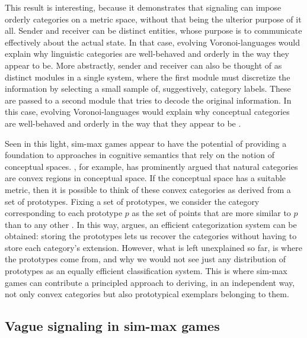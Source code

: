 This result is interesting, because it demonstrates that signaling can
impose orderly categories on a metric space, without that being the
ulterior purpose of it all. Sender and receiver can be distinct
entities, whose purpose is to communicate effectively about the actual
state. In that case, evolving Voronoi-languages would explain why
linguistic categories are well-behaved and orderly in the way they
appear to be. More abstractly, sender and receiver can also be thought
of as distinct modules in a single system, where the first module must
discretize the information by selecting a small sample of,
suggestively, category labels. These are passed to a second module
that tries to decode the original information. In this case, evolving
Voronoi-languages would explain why conceptual categories are
well-behaved and orderly in the way that they appear to be
\citep[e.g.][for more on this latter
interpretation]{OConnor2013:Evolving-Percep}.

Seen in this light, sim-max games appear to have the potential of
providing a foundation to approaches in cognitive semantics that rely
on the notion of conceptual spaces.
\citet[][70--77]{Gardenfors2000:Conceptual-Spac}, for example, has
prominently argued that natural categories are convex regions in
conceptual space. If the conceptual space has a suitable metric, then
it is possible to think of these convex categories as derived from a
set of prototypes. Fixing a set of prototypes, we consider the
category corresponding to each prototype $p$ as the set of points that
are more similar to $p$ than to any other
\citep[e.g.][]{OkabeBoots2000:Spatial-Tessell}. In this way,
\citet{Gardenfors2000:Conceptual-Spac} argues, an efficient
categorization system can be obtained: storing the prototypes lets us
recover the categories without having to store each category's
extension. However, what is left unexplained so far, is where the
prototypes come from, and why we would not see just any distribution
of prototypes as an equally efficient classification system. This is
where sim-max games can contribute a principled approach to deriving,
in an independent way, not only convex categories but also
prototypical exemplars belonging to them.


\subsection{Vague signaling in sim-max games}

